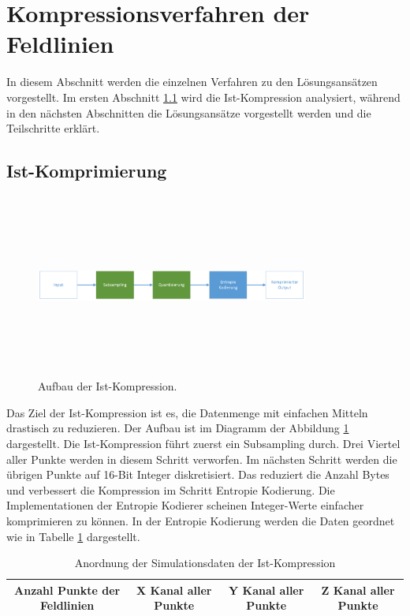\section{Kompressionsverfahren der Feldlinien} \label{konzept}
In diesem Abschnitt werden die einzelnen Verfahren zu den Lösungsansätzen vorgestellt. Im ersten Abschnitt \ref{konzept:ist-komprimierung} wird die Ist-Kompression analysiert, während in den nächsten Abschnitten die  Lösungsansätze vorgestellt werden und die Teilschritte erklärt.

\subsection{Ist-Komprimierung} \label{konzept:ist-komprimierung}
\begin{figure}[!htbp]
	\center
	\includegraphics[width=0.8\textwidth,height=6cm,keepaspectratio]{./pictures/konzept/ist/aufbau.png}
	\caption{Aufbau der Ist-Kompression.}
	\label{konzept:ist:aufbau:diagramm}
\end{figure}
Das Ziel der Ist-Kompression ist es, die Datenmenge mit einfachen Mitteln drastisch zu reduzieren. Der Aufbau ist im Diagramm der Abbildung \ref{konzept:ist:aufbau:diagramm} dargestellt. Die Ist-Kompression führt zuerst ein Subsampling durch. Drei Viertel aller Punkte werden in diesem Schritt verworfen. Im nächsten Schritt werden die übrigen Punkte  auf 16-Bit Integer diskretisiert. Das reduziert die Anzahl Bytes und verbessert die Kompression im Schritt Entropie Kodierung. Die Implementationen der Entropie Kodierer scheinen Integer-Werte einfacher komprimieren zu können. In der Entropie Kodierung werden die Daten geordnet wie in Tabelle \ref{konzept:ist:entropie} dargestellt.
\begin{table}[!htbp]
	\center
	\begin{tabular}{|c|c|c|c|}
	\hline
	Anzahl Punkte der Feldlinien & X Kanal aller Punkte & Y Kanal aller Punkte & Z Kanal aller Punkte \\\hline
	\end{tabular}
	\caption{Anordnung der Simulationsdaten der Ist-Kompression}
	\label{konzept:ist:entropie}
\end{table}
